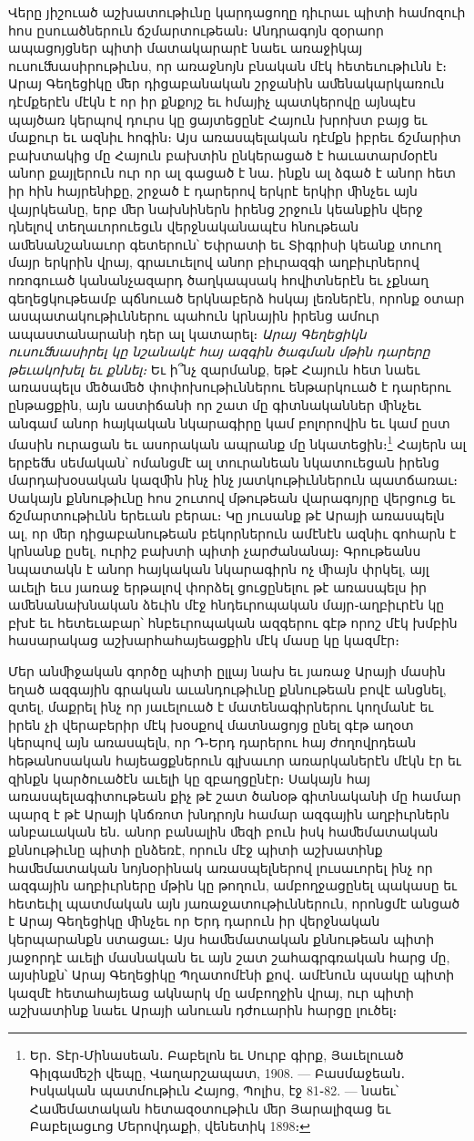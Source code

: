 \documentclass{article}
\begin{document}
{Վերը յիշուած աշխատութիւնը կարդացողը դիւրաւ պիտի համոզուի հոս ըսուածներուն ճշմարտութեան։ Անդրագոյն զօրաոր ապացոյցներ պիտի մատակարարէ նաեւ առաջիկայ ուսուﬓասիրութիւնս, որ առաջնոյն բնական մէկ հետեւութիւնն է։ Արայ Գեղեցիկը ﬔր դիցաբանական շրջանին աﬔնակարկառուն դէմքերէն մէկն է որ իր քնքոյշ եւ հմայիչ պատկերովը այնպէս պայծառ կերպով դուրս կը ցայտեցընէ Հայուն խրոխտ բայց եւ մաքուր եւ ազնիւ հոգին։ Այս առասպելական դէմքն իբրեւ ճշմարիտ բախտակից մը Հայուն բախտին ընկերացած է հաւատարմօրէն անոր քայլերուն ուր որ ալ գացած է նա․ ինքն ալ ձգած է անոր հետ իր հին հայրենիքը, շրջած է դարերով երկրէ երկիր ﬕնչեւ այն վայրկեանը, երբ ﬔր նախնիներն իրենց շրջուն կեանքին վերջ դնելով տեղաւորուեցւն վերջնականապէս հնութեան աﬔնանշանաւոր գետերուն՝ Եփրատի եւ Տիգրիսի կեանք տուող մայր երկրին վրայ, գրաւուելով անոր բիւրազգի աղբիւրներով ոռոգուած կանանչազարդ ծաղկապսակ հովիտներէն եւ չքնաղ գեղեցկութեամբ պճնուած երկնաբերձ հսկայ լեռներէն, որոնք օտար ասպատակութիւններու պահուն կրնային իրենց ամուր ապաստանարանի դեր ալ կատարել։ \emph{Արայ Գեղեցիկն ուսուﬓասիրել կը նշանակէ հայ ազգին ծագման մթին դարերը թեւակոխել եւ քննել։} Եւ ի՞նչ զարմանք, եթէ Հայուն հետ նաեւ առասպելս ﬔծաﬔծ փոփոխութիւններու ենթարկուած է դարերու ընթացքին, այն աստիճանի որ շատ մը գիտնականներ ﬕնչեւ անգամ անոր հայկական նկարագիրը կամ բոլորովին եւ կամ ըստ մասին ուրացան եւ ասորական ապրանք մը նկատեցին։\footnote{Եր․ Տէր֊Մինասեան․ Բաբելոն եւ Սուրբ գիրք, Յաւելուած Գիլգաﬔշի վեպը, Վաղարշապատ, 1908. — Բասմաջեան․ Իսկական պատմութիւն Հայոց, Պոլիս, էջ 81֊82. — նաեւ՝ Հաﬔմատական հետազօտութիւն ﬔր Յարալիզաց եւ Բաբելացւոց Մերովդաքի, վենետիկ 1898։} Հայերն ալ երբեﬓ սեմական՝ ոմանցմէ ալ տուրանեան նկատուեցան իրենց մարդախօսական կազﬕն ինչ ինչ յատկութիւններուն պատճառաւ։ Սակայն քննութիւնը հոս շուտով մթութեան վարագոյրը վերցուց եւ ճշմարտութիւնն երեւան բերաւ։ Կը յուսանք թէ Արայի առասպելն ալ, որ ﬔր դիցաբանութեան բեկորներուն ամէնէն ազնիւ գոհարն է կրնանք ըսել, ուրիշ բախտի պիտի չարժանանայ։ Գրութեանս նպատակն է անոր հայկական նկարագիրն ոչ ﬕայն փրկել, այլ աւելի եւս յառաջ երթալով փորձել ցուցընելու թէ առասպելս իր աﬔնանախնական ձեւին մէջ հնդեւրոպական մայր֊աղբիւրէն կը բխէ եւ հետեւաբար՝ հնբեւրոպական ազգերու գէթ որոշ մէկ խմբին հասարակաց աշխարհահայեացքին մէկ մասը կը կազմէր։

Մեր անﬕջական գործը պիտի ըլլայ նախ եւ յառաջ Արայի մասին եղած ազգային գրական աւանդութիւնը քննութեան բովէ անցնել, զտել, մաքրել ինչ որ յաւելուած է մատենագիրներու կողմանէ եւ իրեն չի վերաբերիր մէկ խօսքով մատնացոյց ընել գէթ աղօտ կերպով այն առասպելն, որ Դ֊Երդ դարերու հայ ժողովրդեան հեթանոսական հայեացքներուն գլխաւոր առարկաներէն մէկն էր եւ զինքն կարծուածէն աւելի կը զբաղցընէր։ Սակայն հայ առասպելագիտութեան քիչ թէ շատ ծանօթ գիտնականի մը համար պարզ է թէ Արայի կնճռոտ խնդրոյն համար ազգային աղբիւրներն անբաւական են․ անոր բանալին ﬔզի բուն իսկ հաﬔմատական քննութիւնը պիտի ընձեռէ, որուն մէջ պիտի աշխատինք հաﬔմատական նոյնօրինակ առասպելներով լուսաւորել ինչ որ ազգային աղբիւրները մթին կը թողուն, ամբողջացընել պակասը եւ հետեւիլ պատմական այն յառաջատութիւններուն, որոնցմէ անցած է Արայ Գեղեցիկը ﬕնչեւ որ Երդ դարուն իր վերջնական կերպարանքն ստացաւ։ Այս հաﬔմատական քննութեան պիտի յաջորդէ աւելի մասնական եւ այն շատ շահագրգռական հարց մը, այսինքն՝ Արայ Գեղեցիկը Պղատոմէնի քով․ ամէնուն պսակը պիտի կազմէ հետահայեաց ակնարկ մը ամբողջին վրայ, ուր պիտի աշխատինք նաեւ Արայի անուան դժուարին հարցը լուծել։}
\clearpage
\end{document}
